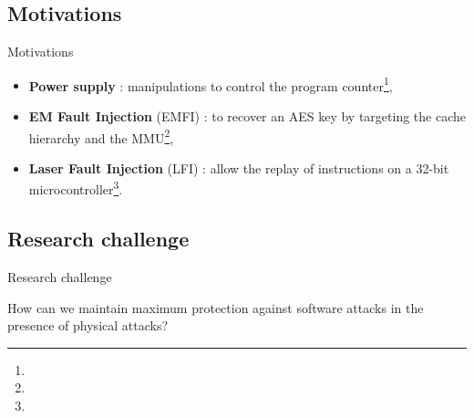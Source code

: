 \subsection{Motivations}
\begin{frame}{Motivations}
    \begin{block}{}
        \begin{itemize}
            \item \textbf{Power supply} : manipulations to control the program counter\footnote[frame]{\tiny{}},
            \item \textbf{EM Fault Injection} (EMFI) : to recover an AES key by targeting the cache hierarchy and the MMU\footnote[frame]{\tiny{}},
            \item \textbf{Laser Fault Injection} (LFI) : allow the replay of instructions on a 32-bit microcontroller\footnote[frame]{\tiny{}}.
        \end{itemize}
    \end{block}

\end{frame}
\subsection{Research challenge}
\begin{frame}{Research challenge}
    \begin{exampleblock}{}
        \centering
        \Large How can we maintain maximum protection against software attacks in the presence of physical attacks?
    \end{exampleblock}
\end{frame}
